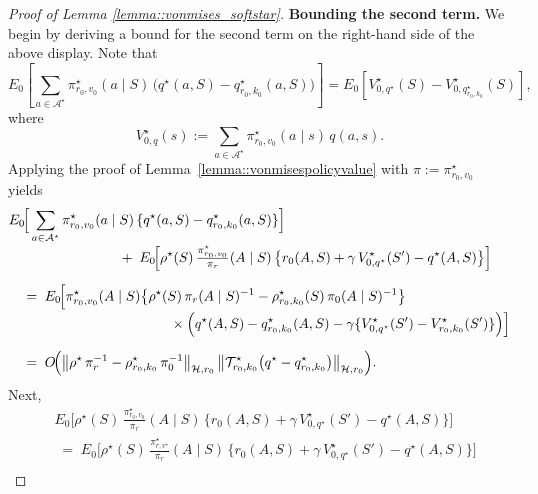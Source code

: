 \documentclass[11pt]{article}
\theoremstyle{plain}
\begin{document}
\begin{proof}[Proof of Lemma \ref{lemma::vonmises_softstar}]
\noindent \textbf{Bounding the second term.}
We begin by deriving a bound for the second term on the right-hand side of the above display. Note that
\[
E_0\!\left[
    \sum_{a \in \mathcal{A}^\star} 
        \pi_{r_0,v_0}^\star(a \mid S)\,
        \bigl(q^\star(a,S) - q_{r_0,k_0}^\star(a,S)\bigr)
\right]
= 
E_0\!\left[
    V_{0,q^\star}^\star(S) - V_{0,q_{r_0,k_0}^\star}^\star(S)
\right],
\]
where
\[
V_{0,q}^\star(s)
:= 
\sum_{a \in \mathcal{A}^\star} 
    \pi_{r_0,v_0}^\star(a \mid s)\, q(a,s).
\]
Applying the proof of Lemma~\ref{lemma::vonmisespolicyvalue} with $\pi := \pi_{r_0,v_0}^\star$ yields
\begin{align*}
& E_0\!\Big[
    \sum_{a \in \mathcal{A}^\star} 
        \pi_{r_0,v_0}^\star(a \mid S)\,
        \{ q^\star(a,S) - q_{r_0,k_0}^\star(a,S) \}
\Big]
\\[-2pt]
&\hspace{2.8cm}
+\;
E_0\!\Big[\rho^\star(S)\,
       \tfrac{\pi_{r_0,v_0}^\star}{\pi_r}(A \mid S)\,
        \bigl\{
            r_0(A,S)
            + \gamma\,V_{0,q^\star}^\star(S')
            - q^\star(A,S)
        \bigr\}
\Big]
\\[6pt]
&\quad=\;
E_0\!\Big[
    \pi_{r_0,v_0}^\star(A \mid S)
    \bigl\{
        \rho^\star(S)\,\pi_r(A \mid S)^{-1}
        - \rho_{r_0,k_0}^\star(S)\,\pi_0(A \mid S)^{-1}
    \bigr\}
\\[-2pt]
&\hspace{4.1cm}\times
	    \Bigl(
	        q^\star(A,S)
	        - q_{r_0,k_0}^\star(A,S)
	        - \gamma\{
	            V_{0,q^\star}^\star(S')
	            - V_{r_0,k_0}^\star(S')
	        \}
	    \Bigr)
	\Big]
\\[6pt]
&\quad=\;
O\!\Big(
    \bigl\|
        \rho^\star\,\pi_r^{-1}
        - \rho_{r_0,k_0}^\star\,\pi_0^{-1}
    \bigr\|_{\mathcal{H},r_0}\,
    \bigl\|
        \mathcal{T}_{r_0,k_0}^\star
        \bigl(q^\star - q_{r_0,k_0}^\star\bigr)
    \bigr\|_{\mathcal{H},r_0}
\Big).
\end{align*}
Next,
\begin{align*}
& E_0\!\Big[\rho^\star(S)\,
       \tfrac{\pi_{r_0,v_0}^\star}{\pi_r}(A \mid S)\,
        \bigl\{
            r_0(A,S)
            + \gamma\,V_{0,q^\star}^\star(S')
            - q^\star(A,S)
        \bigr\}
\Big]
\\
&\;=\;
E_0\!\Big[\rho^\star(S)\,
       \tfrac{\pi_{r,v^\star}^\star}{\pi_r}(A \mid S)\,
        \bigl\{
            r_0(A,S)
            + \gamma\,V_{0,q^\star}^\star(S')
            - q^\star(A,S)
        \bigr\}
\Big]
\\[-2pt]

\end{align*}
\end{proof}
\end{document}
